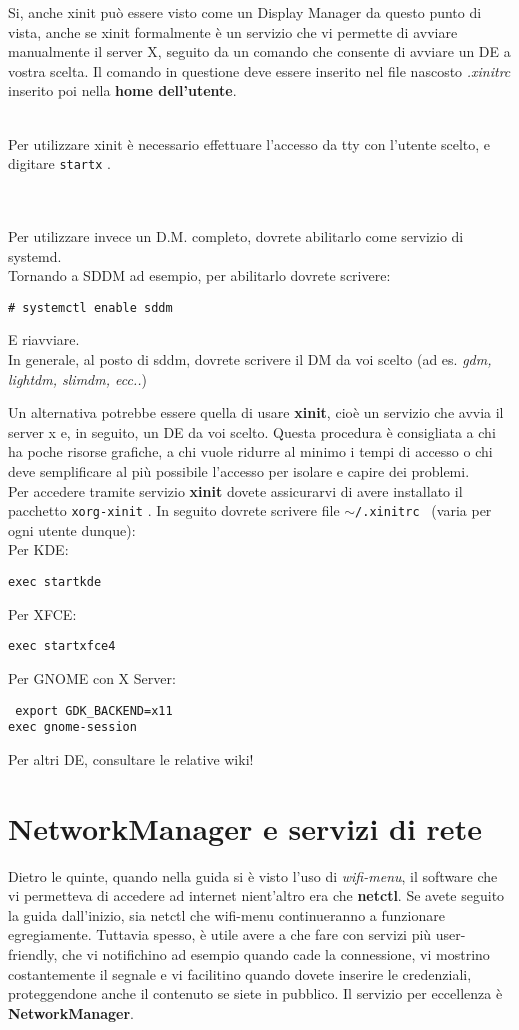 \documentclass[twoside,italian]{book}
\newcommand{\nlinea}{
	\leavevmode
	\\
}
\newcommand{\centcode}[1]{
	
	\definecolor{centcode}{rgb}{0.5,0.1,0.1}
	
	\begin{center}
	 	\texttt{\textcolor{centcode}{#1}}
	\end{center}
	
	
}
\newcommand{\code}[1]{
	\texttt{\textcolor{code}{#1}}
}
\begin{document}
			Si, anche xinit può essere visto come un Display Manager da questo punto di vista, anche se xinit formalmente è un servizio che vi permette di avviare manualmente il server X, seguito da un comando che consente di avviare un DE a vostra scelta. Il comando in questione deve essere inserito nel file nascosto \textit{.xinitrc} inserito poi nella \textbf{home dell'utente}.
			\nlinea
			Per utilizzare xinit è necessario effettuare l'accesso da tty con l'utente scelto, e digitare \code{startx}.
			\nlinea
			\nlinea
			Per utilizzare invece un D.M. completo, dovrete abilitarlo come servizio di systemd.\\
			Tornando a SDDM ad esempio, per abilitarlo dovrete scrivere: \centcode{\# systemctl enable sddm}E riavviare.\\ In generale, al posto di sddm, dovrete scrivere il DM da voi scelto (ad es. \textit{gdm, lightdm, slimdm, ecc..})
			
			
			Un alternativa potrebbe essere quella di usare \textbf{xinit}, cioè un servizio che avvia il server x e, in seguito, un DE da voi scelto. Questa procedura è consigliata a chi ha poche risorse grafiche, a chi vuole ridurre al minimo i tempi di accesso o chi deve semplificare al più possibile l'accesso per isolare e capire dei problemi.\\
			Per accedere tramite servizio \textbf{xinit} dovete assicurarvi di avere installato il pacchetto \code{xorg-xinit}. In seguito dovrete scrivere file \code{$\sim$/.xinitrc }(varia per ogni utente dunque):\\
			Per KDE:
			\centcode{exec startkde} 
			Per XFCE:
			\centcode{exec startxfce4}
			Per GNOME con X Server:
			\centcode{
				export GDK\_BACKEND=x11\\
				exec gnome-session
			}			
		
			Per altri DE, consultare le relative wiki!
			
		\section{NetworkManager e servizi di rete}
			Dietro le quinte, quando nella guida si è visto l'uso di \textit{wifi-menu}, il software che vi permetteva di accedere ad internet nient'altro era che \textbf{netctl}. Se avete seguito la guida dall'inizio, sia netctl che wifi-menu continueranno a funzionare egregiamente. 
			Tuttavia spesso, è utile avere a che fare con servizi più user-friendly, che vi notifichino ad esempio quando cade la connessione, vi mostrino costantemente il segnale e vi facilitino quando dovete inserire le credenziali, proteggendone anche il contenuto se siete in pubblico.
			Il servizio per eccellenza è \textbf{NetworkManager}.
			
\end{document}
